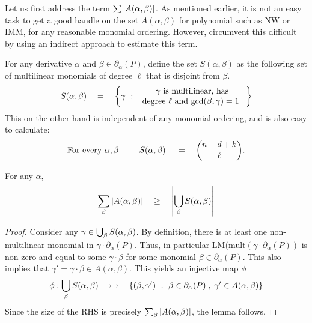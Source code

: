\documentclass{beatcs}
\newcommand{\NW}{\mathrm{NW}}
\newcommand{\IMM}{\mathrm{IMM}}
\newcommand{\spaced}[1]{\quad#1\quad}
\begin{document}
 Let us first address the term $\sum \left|A(\alpha, \beta)\right|$. As mentioned earlier, it is not an easy task to get a good handle on the set $A(\alpha, \beta)$ for polynomial such as $\NW$ or $\IMM$, for any reasonable monomial ordering. However, \cite{KS14} circumvent this difficult by using an indirect approach to estimate this term. 

For any derivative $\alpha$ and $\beta \in \partial_\alpha(P)$, define the set $S(\alpha, \beta)$ as the following set of multilinear monomials of degree $\ell$ that is disjoint from $\beta$. 
\[
S(\alpha, \beta) \spaced{=} \setdef{\gamma}{\begin{array}{c}\text{$\gamma$ is multilinear, has}\\\text{degree $\ell$ and $\gcd(\beta,\gamma)=1$ }\end{array}}
\]
This on the other hand is independent of any monomial ordering, and is also easy to calculate:
\[
\text{For every $\alpha, \beta$}\quad\quad \abs{S(\alpha, \beta)} \spaced{=} \binom{n - d + k}{\ell}.
\] 
\begin{lemma}[\cite{KS14}]\label{lem:As-to-Ss}
For any $\alpha$, 
\[
\sum_{\beta} \abs{A(\alpha, \beta)} \spaced{\geq} \abs{\Union_{\beta} S(\alpha, \beta)}
\]
\end{lemma}
\begin{proof}
Consider any $\gamma \in \bigcup_{\beta}S(\alpha, \beta)$. By definition, there is at least one non-multilinear monomial in $\gamma \cdot \partial_\alpha(P)$. Thus, in particular $\mathrm{LM}(\mathrm{mult}(\gamma \cdot \partial_\alpha(P))$ is non-zero and equal to some $\gamma \cdot \beta$ for some monomial $\beta \in \partial_\alpha(P)$. This also implies that $\gamma' = \gamma\cdot \beta \in A(\alpha, \beta)$. This yields an injective map $\phi$ 
\[
\phi:\Union_\beta S(\alpha,\beta) \spaced{\rightarrowtail} \setdef{(\beta, \gamma')}{\beta\in \partial_\alpha(P)\;,\;\gamma' \in A(\alpha, \beta)}
\] 
Since the size of the RHS is precisely $\sum_\beta \left|A(\alpha, \beta)\right|$, the lemma follows. 
\end{proof}
\end{document}
